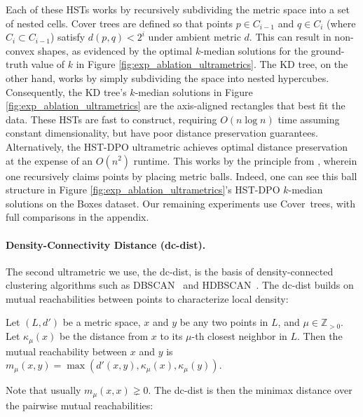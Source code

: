 Each of these HSTs works by recursively subdividing the metric space into a set of nested cells. Cover trees are defined so that points $p \in C_{i-1}$ and $q \in C_i$ (where $C_i \subset C_{i-1}$) satisfy $d(p,q) < 2^i$ under ambient metric $d$. This can result in non-convex shapes, as evidenced by the optimal $k$-median solutions for the ground-truth value of $k$ in Figure \ref{fig:exp_ablation_ultrametrics}. The KD tree, on the other hand, works by simply subdividing the space into nested hypercubes. Consequently, the KD tree's $k$-median solutions in Figure \ref{fig:exp_ablation_ultrametrics} are the axis-aligned rectangles that best fit the data. These HSTs are fast to construct, requiring $O(n \log n)$ time assuming constant dimensionality, but have poor distance preservation guarantees. Alternatively, the HST-DPO ultrametric achieves optimal distance preservation at the expense of an $O(n^2)$ runtime. This works by the principle from \citet{HST_2}, wherein one recursively claims points by placing metric balls. Indeed, one can see this ball structure in Figure \ref{fig:exp_ablation_ultrametrics}'s HST-DPO $k$-median solutions on the Boxes dataset. Our remaining experiments use Cover~trees, with full comparisons in the appendix.


\paragraph{Density-Connectivity Distance (dc-dist).}
\label{ssec:dc_experiments}
The second ultrametric we use, the dc-dist, is the basis of density-connected clustering algorithms such as DBSCAN~\citep{dbscan} and HDBSCAN~\citep{hdbscan}. The dc-dist builds on mutual reachabilities between points to characterize local density:  

\begin{definition}
    Let $(L, d')$ be a metric space, $x$ and $y$ be any two points in $L$, and $\mu \in \mathbb{Z}_{>0}$. Let $\kappa_{\mu}(x)$ be the distance from $x$ to its $\mu$-th closest neighbor in $L$. Then the mutual reachability between $x$ and $y$ is $m_{\mu}(x, y) = \max(d'(x, y), \kappa_{\mu}(x), \kappa_{\mu}(y))$.
\end{definition}
Note that usually $m_\mu(x,x)\gneq 0$. 
The dc-dist is then the minimax distance over the pairwise mutual reachabilities:

